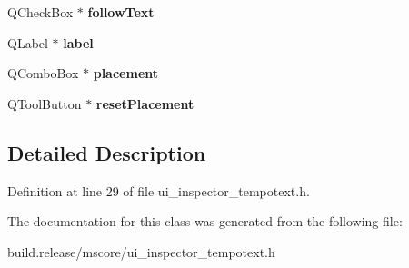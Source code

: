 \begin{DoxyCompactItemize}
Q\+Check\+Box $\ast$ {\bfseries follow\+Text}
\item 
\mbox{\label{class_ui___inspector_tempo_text_a0ac7ad951f5a7c55e76f8919bf95fdd7}} 
Q\+Label $\ast$ {\bfseries label}
\item 
\mbox{\label{class_ui___inspector_tempo_text_a4812ec644c23563780a695d2f42cda0a}} 
Q\+Combo\+Box $\ast$ {\bfseries placement}
\item 
\mbox{\label{class_ui___inspector_tempo_text_ae7e7b9cb45c4c1f927d7dcfb7cbc905a}} 
Q\+Tool\+Button $\ast$ {\bfseries reset\+Placement}
\end{DoxyCompactItemize}


\subsection{Detailed Description}


Definition at line 29 of file ui\+\_\+inspector\+\_\+tempotext.\+h.



The documentation for this class was generated from the following file\+:\begin{DoxyCompactItemize}
\item 
build.\+release/mscore/ui\+\_\+inspector\+\_\+tempotext.\+h\end{DoxyCompactItemize}
